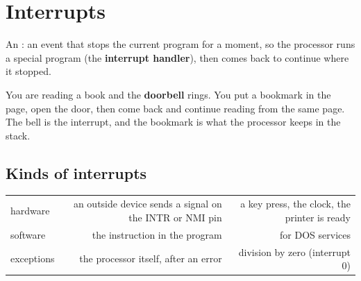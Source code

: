 \begin{sharh}
\end{sharh}

\section{Interrupts}

\begin{tarif}
    An : an event that stops the current program for a moment, so the processor
    runs a special program (the \textbf{interrupt handler}), then comes back to continue where it stopped.
\end{tarif}

\begin{tashbih}
    You are reading a book and the \textbf{doorbell} rings. You put a bookmark in the page, open the door, then
    come back and continue reading from the same page. The bell is the interrupt, and the bookmark is what the
    processor keeps in the stack.
\end{tashbih}

\subsection{Kinds of interrupts}
\begin{center}
\small
\begin{tabularx}{\linewidth}{|>{\centering\arraybackslash}p{3cm}|R|R|}
    \hline
     &  &  \\ \hline
    hardware & an outside device sends a signal on the INTR or NMI pin & a key press, the clock, the printer is ready \\ \hline
    software & the instruction  in the program &  for DOS services \\ \hline
    exceptions & the processor itself, after an error & division by zero (interrupt 0) \\ \hline
\end{tabularx}
\end{center}

